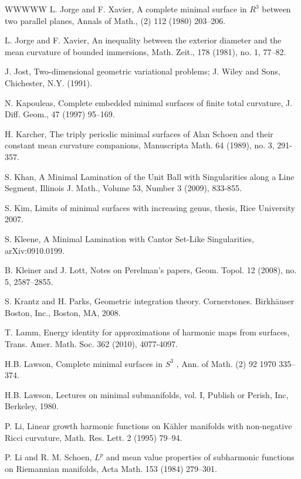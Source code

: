 \begin{thebibliography}{WWWWW}
 L. Jorge and F. Xavier, A complete minimal surface in $R^{3}$ between two parallel planes, Annals of Math., (2) 112 (1980) 203–206.

 L. Jorge and F. Xavier, An inequality between the exterior diameter and the mean curvature of bounded immersions, Math. Zeit., 178 (1981), no. 1, 77–82.

 J. Jost, Two-dimensional geometric variational problems; J. Wiley and Sons, Chichester, N.Y. (1991).

 N. Kapouleas, Complete embedded minimal surfaces of finite total curvature, J. Diff. Geom., 47 (1997) 95–169.

 H. Karcher, The triply periodic minimal surfaces of Alan Schoen and their constant mean curvature companions, Manuscripta Math. 64 (1989), no. 3, 291-357.

 S. Khan, A Minimal Lamination of the Unit Ball with Singularities along a Line Segment, Illinois J. Math., Volume 53, Number 3 (2009), 833-855.

 S. Kim, Limits of minimal surfaces with increasing genus, thesis, Rice University 2007.

 S. Kleene, A Minimal Lamination with Cantor Set-Like Singularities, arXiv:0910.0199.

 B. Kleiner and J. Lott, Notes on Perelman's papers, Geom. Topol. 12 (2008), no. 5, 2587–2855.

 S. Krantz and H. Parks, Geometric integration theory. Cornerstones. Birkhäuser Boston, Inc., Boston, MA, 2008.

 T. Lamm, Energy identity for approximations of harmonic maps from surfaces, Trans. Amer. Math. Soc. 362 (2010), 4077-4097.

 H.B. Lawson, Complete minimal surfaces in $S^{3}$ , Ann. of Math. (2) 92 1970 335–374.

 H.B. Lawson, Lectures on minimal submanifolds, vol. I, Publish or Perish, Inc, Berkeley, 1980.

 P. Li, Linear growth harmonic functions on Kähler manifolds with non-negative Ricci curvature, Math. Res. Lett. 2 (1995) 79–94.

 P. Li and R. M. Schoen, $L^{p}$ and mean value properties of subharmonic functions on Riemannian manifolds, Acta Math. 153 (1984) 279–301.


\end{thebibliography}
